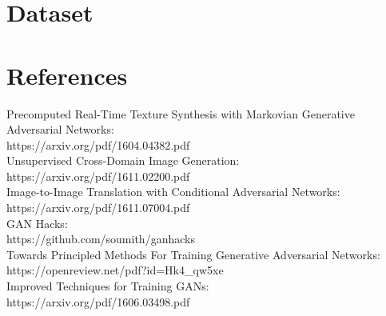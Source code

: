 \documentclass{article} %
\begin{document}
\section{Dataset}





\section{References}

Precomputed Real-Time Texture Synthesis with Markovian Generative Adversarial Networks: \\ 
\quad https://arxiv.org/pdf/1604.04382.pdf \\ 

Unsupervised Cross-Domain Image Generation: \\ 
\quad https://arxiv.org/pdf/1611.02200.pdf \\ 

Image-to-Image Translation with Conditional Adversarial Networks: \\ 
\quad https://arxiv.org/pdf/1611.07004.pdf \\ 

GAN Hacks:  \\ 
\quad https://github.com/soumith/ganhacks \\ 

Towards Principled Methods For Training Generative Adversarial Networks: \\ 
\quad https://openreview.net/pdf?id=Hk4\_qw5xe \\ 

Improved Techniques for Training GANs: \\ 
\quad https://arxiv.org/pdf/1606.03498.pdf \\ 

\end{document}

